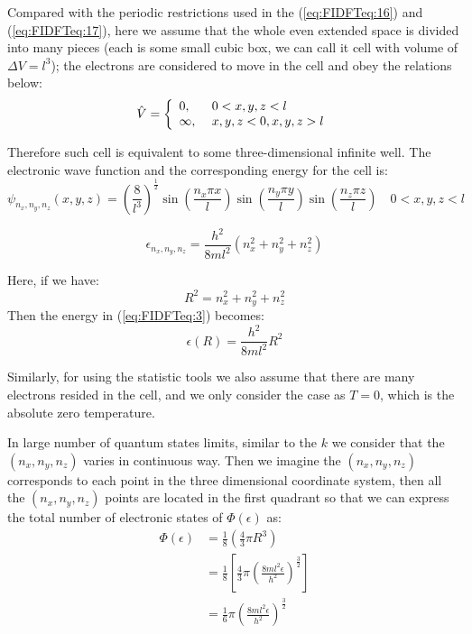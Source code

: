 Compared with the periodic restrictions used in the
(\ref{eq:FIDFTeq:16}) and (\ref{eq:FIDFTeq:17}), here we assume that
the whole even extended space is divided into many pieces (each is
some small cubic box, we can call it cell with volume of $\Delta V =
l^{3}$); the electrons are considered to move in the cell and obey the
relations below:
\begin{equation}\label{eq:FIDFTeq:1}
\hat{V} = \left\{
    \begin{array}{ll} 0, & \hbox{ $0 < x,y,z < l$} \\ \infty, & \hbox{
$x,y,z<0, x,y,z>l$}
    \end{array} \right.
\end{equation}

Therefore such cell is equivalent to some three-dimensional infinite
well. The electronic wave function and the corresponding energy for
the cell is:
\begin{equation}\label{eq:FIDFTeq:2}
\psi_{n_{x}, n_{y}, n_{z}}(x,y,z) =
(\frac{8}{l^{3}})^{\frac{1}{2}} \sin (\frac{n_{x}\pi x}{l})\sin
(\frac{n_{y}\pi y}{l})\sin (\frac{n_{z}\pi z}{l}) \quad 0 < x,y,z < l
\end{equation}

\begin{equation}\label{eq:FIDFTeq:3}
\epsilon_{n_{x}, n_{y}, n_{z}} = \frac{h^{2}}{8ml^{2}}(n^{2}_{x} +
n^{2}_{y} + n^{2}_{z})
\end{equation}

Here, if we have:
\begin{equation}
  \label{eq:FIDFTeq:4}
  R^{2} = n^{2}_{x} + n^{2}_{y} + n^{2}_{z}
\end{equation}
Then the energy in (\ref{eq:FIDFTeq:3}) becomes:
\begin{equation}
  \label{eq:FIDFTeq:66}
\epsilon(R) = \frac{h^{2}}{8ml^{2}}R^{2}
\end{equation}

Similarly, for using the statistic tools we also assume that there are
many electrons resided in the cell, and we only consider the case as
$T=0$, which is the absolute zero temperature.

In large number of quantum states limits, similar to the $k$ we
consider that the $(n_{x}, n_{y}, n_{z})$ varies in continuous way.
Then we imagine the $(n_{x}, n_{y}, n_{z})$ corresponds to
each point in the three dimensional coordinate system, then all the
$(n_{x}, n_{y}, n_{z})$ points are located in the first quadrant so
that we can express the total number of electronic states of
$\Phi(\epsilon)$ as:
\begin{align}
  \label{eq:FIDFTeq:5}
  \Phi(\epsilon) &= \frac{1}{8}\left(\frac{4}{3}\pi R^{3}\right)
  \nonumber \\
  &=\frac{1}{8}\left[\frac{4}{3}\pi
    \left(\frac{8ml^{2}\epsilon}{h^{2}}\right)^{\frac{3}{2}}\right] \nonumber \\
  &=\frac{1}{6}\pi
    \left(\frac{8ml^{2}\epsilon}{h^{2}}\right)^{\frac{3}{2}}
\end{align}

